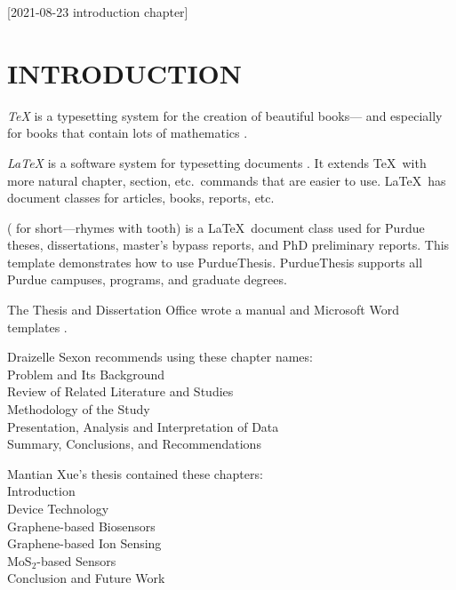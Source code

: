 [2021-08-23 introduction chapter]

\chapter{INTRODUCTION}


{\sl\TeX\/} is a typesetting system for the creation of beautiful books---%
and especially for books that contain lots of mathematics
\cite[page v]{knuth2012}.

{\sl\LaTeX\/} is a software system for typesetting documents
\cite[back cover]{lamport1994}.
It extends \TeX\ with more natural chapter,
section,
etc.~commands that are easier to use.
\LaTeX\ has document classes for
articles,
books,
reports,
etc.

{\sl\PurdueThesisLogo\/}
({\sl\PuThLogo} for short---rhymes with tooth)
is a \LaTeX\ document class used for Purdue theses,
dissertations,
master’s bypass reports,
and PhD preliminary reports.
This template demonstrates how to use PurdueThesis.
PurdueThesis supports all Purdue campuses,
programs,
and graduate degrees.

The Thesis and Dissertation Office wrote a manual \cite{thesis2017}
and Microsoft Word templates \cite{thesis2020}.

Draizelle Sexon \cite{sexon2012}
recommends using these chapter names:\\
 Problem and Its Background\\
 Review of Related Literature and Studies\\
 Methodology of the Study\\
 Presentation, Analysis and Interpretation of Data\\
 Summary, Conclusions, and Recommendations

Mantian Xue's \cite{xue2019} thesis contained these chapters:\\
 Introduction\\
 Device Technology\\
 Graphene-based Biosensors\\
 Graphene-based Ion Sensing\\
 MoS${}_2$-based Sensors\\
 Conclusion and Future Work

